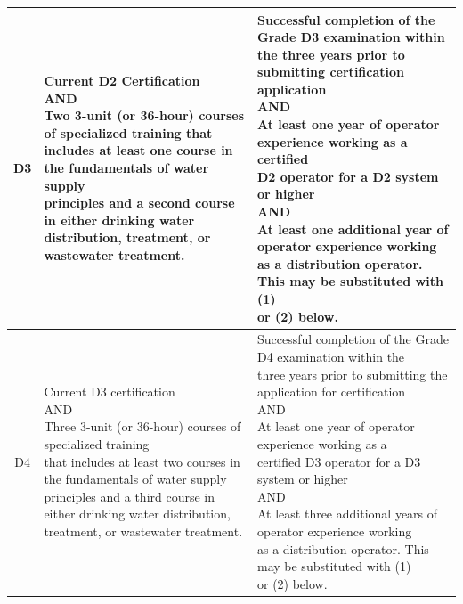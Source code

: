 \documentclass{article}
\begin{document}
\begin{table}[H]
\begin{tabular}{|c|p{7.1cm}|p{7cm}|}
\hline
D3    & \makecell[l]{Current D2 Certification\\AND\\Two 3-unit (or 36-hour) courses of specialized training that\\includes at least one course in the fundamentals of water supply\\ principles and a second course in either drinking water\\distribution, treatment, or   wastewater treatment.} & \makecell[l]{Successful completion of the Grade D3 examination within\\the three years prior to submitting certification application\\AND\\At least one year of operator experience working as a certified\\D2 operator for a D2 system or higher\\AND\\At least one additional year of operator experience working\\as a distribution operator. This may be substituted with (1)\\or (2) below.}\\ 
\hline
D4    & \makecell[l]{Current D3 certification\\ AND \\Three 3-unit (or 36-hour) courses of specialized training\\that includes at least two courses in the fundamentals of water supply\\ principles and a third course in either drinking water distribution,\\treatment, or wastewater treatment.}& \makecell[l]{Successful completion of the Grade   D4 examination within the \\three years prior to submitting the application for certification\\ AND\\ At least one year of operator experience working as a\\certified D3 operator for a D3 system or higher\\ AND\\ At least three additional years of operator experience working\\as a distribution operator. This may be substituted with (1)\\or (2) below.}\\ \hline

\end{tabular}
\end{table}
\end{document}
